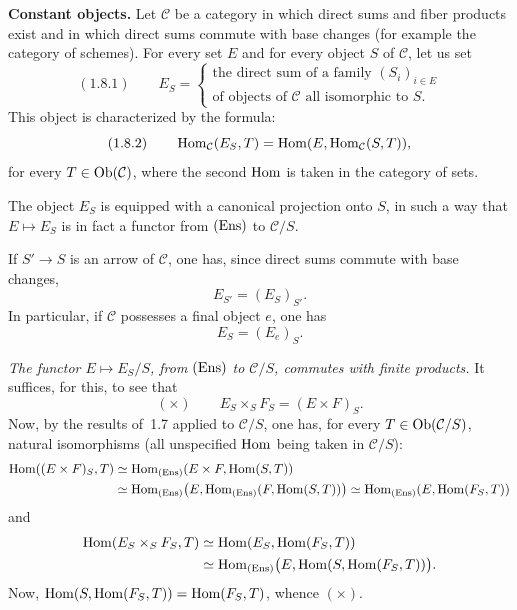 \textbf{Constant objects.}
Let \(\mathcal{C}\) be a category in which direct sums and fiber products exist and in which direct sums commute with base changes (for example the category of schemes). For every set \(E\) and for every object \(S\) of \(\mathcal{C}\), let us set
\[
(1.8.1)\qquad
E_S=
\begin{cases}
\text{the direct sum of a family \((S_i)_{i\in E}\)}\\
\text{of objects of \(\mathcal{C}\) all isomorphic to \(S\).}
\end{cases}
\]
This object is characterized by the formula:
\[
(1.8.2)\qquad
\operatorname{Hom}_{\mathcal{C}}(E_S,T)=\operatorname{Hom}(E,\operatorname{Hom}_{\mathcal{C}}(S,T)),
\]
for every \(T\in\operatorname{Ob}(\mathcal{C})\), where the second \(\operatorname{Hom}\) is taken in the category of sets.

The object \(E_S\) is equipped with a canonical projection onto \(S\), in such a way that \(E\mapsto E_S\) is in fact a functor from \(\textup{(Ens)}\) to \(\mathcal{C}/S\).

If \(S'\to S\) is an arrow of \(\mathcal{C}\), one has, since direct sums commute with base changes,
\[
E_{S'}=(E_S)_{S'}.
\]
In particular, if \(\mathcal{C}\) possesses a final object \(e\), one has
\[
E_S=(E_e)_S.
\]

\emph{The functor \(E\mapsto E_S/S\), from \(\textup{(Ens)}\) to \(\mathcal{C}/S\), commutes with finite products.} It suffices, for this, to see that
\[
(\times)\qquad E_S\times_S F_S=(E\times F)_S.
\]
Now, by the results of~1.7 applied to \(\mathcal{C}/S\), one has, for every \(T\in\operatorname{Ob}(\mathcal{C}/S)\), natural isomorphisms (all unspecified \(\operatorname{Hom}\) being taken in \(\mathcal{C}/S\)):
\[
\begin{aligned}
\operatorname{Hom}((E\times F)_S,T)
&\simeq\operatorname{Hom}_{\textup{(Ens)}}(E\times F,\operatorname{Hom}(S,T))\\
&\simeq\operatorname{Hom}_{\textup{(Ens)}}\bigl(E,\operatorname{Hom}_{\textup{(Ens)}}(F,\operatorname{Hom}(S,T))\bigr)
\simeq\operatorname{Hom}_{\textup{(Ens)}}(E,\operatorname{Hom}(F_S,T))
\end{aligned}
\]
and
\[
\begin{aligned}
\operatorname{Hom}(E_S\times_S F_S,T)
&\simeq\operatorname{Hom}(E_S,\operatorname{Hom}(F_S,T))\\
&\simeq\operatorname{Hom}_{\textup{(Ens)}}\bigl(E,\operatorname{Hom}(S,\operatorname{Hom}(F_S,T))\bigr).
\end{aligned}
\]
Now, \(\operatorname{Hom}(S,\operatorname{Hom}(F_S,T))=\operatorname{Hom}(F_S,T)\), whence \((\times)\).

